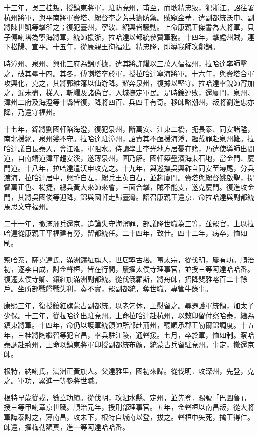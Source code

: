 \begin{pinyinscope}
十三年，吳三桂叛，授鎮東將軍，駐防兗州，甫至，而耿精忠叛，犯浙江。詔往署杭州將軍，與平南將軍賚塔、總督李之芳共籌防禦。賊窺金華，遣副都統沃申、副將陳世凱等擊卻之；復犯臺州，寧波、紹興皆騷動。上命康親王傑書為大將軍，貝子傅喇塔為寧海將軍，統師援浙，拉哈達以都統參贊軍務。十四年，擊處州賊，連下松陽、宣平。十五年，從康親王徇福建。精忠降，即導我師攻鄭錦。

時漳州、泉州、興化三府為錦所據，遣其將許耀以三萬人偪福州，拉哈達率師擊之，破其壘十四。其冬，傅喇塔卒於軍，授拉哈達寧海將軍。十六年，與賚塔合軍攻興化，克之，其將郭維籓以仙游降。耀奔泉州，復據以堅守。拉哈達率銳師宵加之，漏未盡，梯入，斬耀及諸偽官，入城撫定軍民。是時錦連敗，還廈門，泉州、漳州二府及海澄等十縣皆復，降將四百、兵四千有奇。移師略潮州，叛將劉進忠亦降，乃還守福州。

十七年，錦將劉國軒陷海澄，復犯泉州，斷萬安、江東二橋，扼長泰、同安諸隘，南北援絕，泉州幾不守。拉哈達駐漳州，詔責其不亟援海澄，趣戴罪赴泉州難。拉哈達議自長泰入，會江漲，軍阻水。侍讀學士李光地方居憂在籍，乃遣使導師出間道，自南靖道漳平趨安溪，遂薄泉州，圍乃解。國軒築壘濱海東石地，當金門、廈門道。十八年，拉哈達遣沃申攻克之。十九年，與巡撫吳興祚自同安至潯尾，分兵渡海，拉哈達居中，興祚自左，總兵王英自右，並趨廈門。賚塔與總督姚啟聖，提督萬正色、楊捷，總兵黃大來師來會，三面合擊，賊不能支，遂克廈門。復進攻金門，其將吳國俊等迎降，錦與國軒走歸臺灣。詔召康親王還京，命拉哈達與副都統馬思文守福州。

二十一年，撤滿洲兵還京，追論失守海澄罪，部議降世職為三等，並罷官，上以拉哈達從康親王平福建有勞，留都統任。二十四年，致仕。四十二年，病卒，恤如制。

察哈泰，薩克達氏，滿洲鑲紅旗人，世居寧古塔。事太宗，從伐明，屢有功。順治初，逐李自成，討金聲桓，皆在行間，屢擢太僕寺理事官，並授三等阿達哈哈番。復遷太僕寺卿、鑲紅旗滿洲副都統。從伐俄羅斯，將舟師，招降斐雅喀百二十餘戶。坐所部戰艦戰失利，奏不實，罷副都統，奪世職，專管牛錄事。

康熙三年，復授鑲紅旗蒙古副都統。以老乞休，上慰留之。尋遷護軍統領，加太子少保。十三年，從拉哈達出駐兗州。上命拉哈達赴杭州，以敕印留付察哈泰，繼為鎮東將軍。十四年，命仍以護軍統領帥所部赴荊州，聽順承郡王勒爾錦調度。十五年，三桂將陶繼智等犯宜昌，率兵駐江陵，通聲援。七月，卒於軍，恤如制。察哈泰調赴荊州，上命以鎮東將軍印授副都統布顏，統蒙古兵留駐兗州。事定，撤還京師。

根特，納喇氏，滿洲正黃旗人。父達雅里，國初來歸。從伐明，攻深州，先登，克之。軍功，累進一等參將世職。

根特早歲從戎，數立功績。從伐明，攻泗水縣、定州，並先登，賜號「巴圖魯」，授三等甲喇章京世職。順治元年，授刑部理事官。五年，金聲桓以南昌叛，從大將軍譚泰討之，薄南昌，攻未下，根特自城南以登，拔之。聲桓中矢死，擒王得仁。師還，擢梅勒額真，進一等阿達哈哈番。


\end{pinyinscope}
